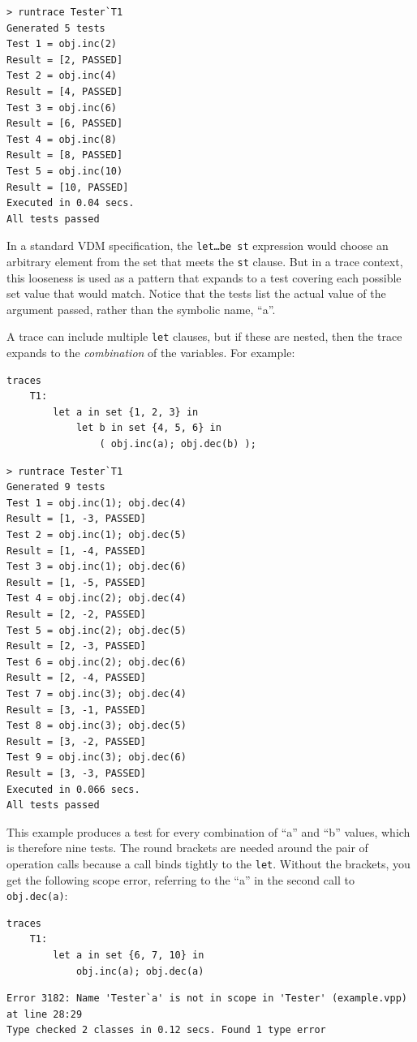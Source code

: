 \documentclass{overturerepchap}
\begin{document}
\begin{verbatim}
> runtrace Tester`T1
Generated 5 tests
Test 1 = obj.inc(2)
Result = [2, PASSED]
Test 2 = obj.inc(4)
Result = [4, PASSED]
Test 3 = obj.inc(6)
Result = [6, PASSED]
Test 4 = obj.inc(8)
Result = [8, PASSED]
Test 5 = obj.inc(10)
Result = [10, PASSED]
Executed in 0.04 secs. 
All tests passed
\end{verbatim}
\normalsize

In a standard VDM specification, the \texttt{let\ldots be st} expression would
choose an arbitrary element from the set that meets the \texttt{st} clause. But
in a trace context, this looseness is used as a pattern that expands to a test
covering each possible set value that would match. Notice that the tests list
the actual value of the argument passed, rather than the symbolic name, ``a''.

A trace can include multiple \texttt{let} clauses, but if these are nested, then
the trace expands to the \emph{combination} of the variables. For example:

\small
\begin{lstlisting}
traces
    T1:
        let a in set {1, 2, 3} in
            let b in set {4, 5, 6} in
                ( obj.inc(a); obj.dec(b) );
\end{lstlisting}

\begin{verbatim}
> runtrace Tester`T1
Generated 9 tests
Test 1 = obj.inc(1); obj.dec(4)
Result = [1, -3, PASSED]
Test 2 = obj.inc(1); obj.dec(5)
Result = [1, -4, PASSED]
Test 3 = obj.inc(1); obj.dec(6)
Result = [1, -5, PASSED]
Test 4 = obj.inc(2); obj.dec(4)
Result = [2, -2, PASSED]
Test 5 = obj.inc(2); obj.dec(5)
Result = [2, -3, PASSED]
Test 6 = obj.inc(2); obj.dec(6)
Result = [2, -4, PASSED]
Test 7 = obj.inc(3); obj.dec(4)
Result = [3, -1, PASSED]
Test 8 = obj.inc(3); obj.dec(5)
Result = [3, -2, PASSED]
Test 9 = obj.inc(3); obj.dec(6)
Result = [3, -3, PASSED]
Executed in 0.066 secs. 
All tests passed
\end{verbatim}
\normalsize

This example produces a test for every combination of ``a'' and ``b'' values,
which is therefore nine tests. The round brackets are needed around the pair of
operation calls because a call binds tightly to the \texttt{let}. Without the
brackets, you get the following scope error, referring to the ``a'' in the
second call to \texttt{obj.dec(a)}:

\small
\begin{lstlisting}
traces
    T1:
        let a in set {6, 7, 10} in
            obj.inc(a); obj.dec(a)
\end{lstlisting}
\scriptsize
\begin{verbatim}
Error 3182: Name 'Tester`a' is not in scope in 'Tester' (example.vpp) at line 28:29
Type checked 2 classes in 0.12 secs. Found 1 type error

\end{verbatim}
\normalsize
\end{document}
